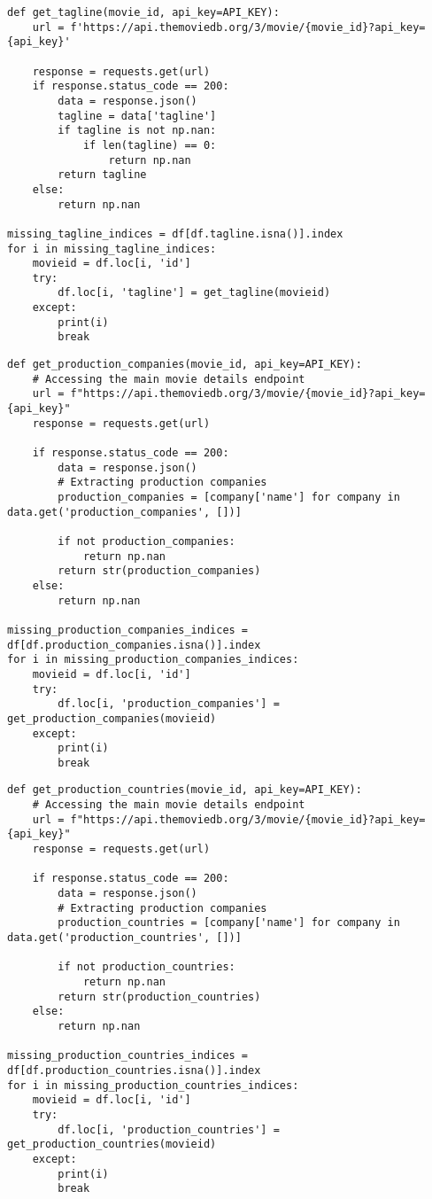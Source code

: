 \begin{lstlisting}
def get_tagline(movie_id, api_key=API_KEY):
    url = f'https://api.themoviedb.org/3/movie/{movie_id}?api_key={api_key}'

    response = requests.get(url)
    if response.status_code == 200:
        data = response.json()
        tagline = data['tagline']
        if tagline is not np.nan:
            if len(tagline) == 0:
                return np.nan
        return tagline
    else:
        return np.nan

missing_tagline_indices = df[df.tagline.isna()].index
for i in missing_tagline_indices:
    movieid = df.loc[i, 'id']
    try:
        df.loc[i, 'tagline'] = get_tagline(movieid)
    except:
        print(i)
        break
\end{lstlisting}

\begin{lstlisting}
def get_production_companies(movie_id, api_key=API_KEY):
    # Accessing the main movie details endpoint
    url = f"https://api.themoviedb.org/3/movie/{movie_id}?api_key={api_key}"
    response = requests.get(url)
    
    if response.status_code == 200:
        data = response.json()
        # Extracting production companies
        production_companies = [company['name'] for company in data.get('production_companies', [])]
        
        if not production_companies:
            return np.nan
        return str(production_companies)
    else:
        return np.nan

missing_production_companies_indices = df[df.production_companies.isna()].index
for i in missing_production_companies_indices:
    movieid = df.loc[i, 'id']
    try:
        df.loc[i, 'production_companies'] = get_production_companies(movieid)
    except:
        print(i)
        break
\end{lstlisting}

\begin{lstlisting}
def get_production_countries(movie_id, api_key=API_KEY):
    # Accessing the main movie details endpoint
    url = f"https://api.themoviedb.org/3/movie/{movie_id}?api_key={api_key}"
    response = requests.get(url)
    
    if response.status_code == 200:
        data = response.json()
        # Extracting production companies
        production_countries = [company['name'] for company in data.get('production_countries', [])]
        
        if not production_countries:
            return np.nan
        return str(production_countries)
    else:
        return np.nan

missing_production_countries_indices = df[df.production_countries.isna()].index
for i in missing_production_countries_indices:
    movieid = df.loc[i, 'id']
    try:
        df.loc[i, 'production_countries'] = get_production_countries(movieid)
    except:
        print(i)
        break
\end{lstlisting}

